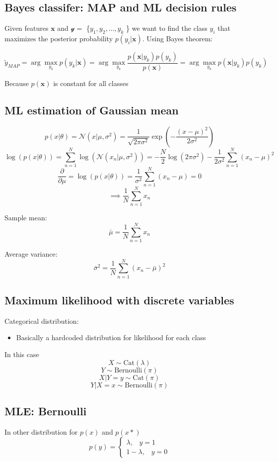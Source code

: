 \documentclass[12pt,a4paper]{article}
\begin{document}
\subsection{Bayes classifer: MAP and ML decision rules}
Given features $\mathbf{x}$ and $\mathscr{y} = $ \{$y_1, y_2, \ldots, y_k$ \} we want to find the class $y_i$ that maximizes the posterior probability $p(y_i|\mathbf{x})$. Using Bayes theorem:

\[
\tilde{y}_{MAP} = \arg\max_{y_k} p(y_k|\mathbf{x}) = \arg\max_{y_k} \frac{p(\mathbf{x}|y_k)p(y_k)}{p(\mathbf{x})} = \arg\max_{y_k} p(\mathbf{x}|y_k)p(y_k)
\]

Because $p(\mathbf{x})$ is constant for all classes

\subsection{ML estimation of Gaussian mean}
\[
p(x|\theta) = \mathcal{N}(x|\mu, \sigma^2) = \frac{1}{\sqrt{2\pi\sigma^2}} \exp\left( -\frac{(x - \mu)^2}{2\sigma^2} \right)
\]
\[
\log(p(x|\theta)) = \sum_{n=1}^{N} \log(\mathcal{N}(x_n|\mu, \sigma^2)) = -\frac{N}{2} \log(2\pi\sigma^2) - \frac{1}{2\sigma^2} \sum_{n=1}^{N} (x_n - \mu)^2
\]
\[
\frac{\partial}{\partial \mu} = \log(p(x|\theta)) = \frac{1}{\sigma^2} \sum_{n=1}^{N} (x_n - \mu) = 0
\]
\[
\implies \frac{1}{N} \sum_{n=1}^{N} x_n
\]

Sample mean:
\[
\bar{\mu} = \frac{1}{N} \sum_{n=1}^{N} x_n
\]

Average variance:
\[
\bar{\sigma}^2 = \frac{1}{N} \sum_{n=1}^{N} (x_n - \bar{\mu})^2
\]

\subsection{Maximum likelihood with discrete variables}
Categorical distribution:
\begin{itemize}
    \item Basically a hardcoded distribution for likelihood for each class
\end{itemize}
In this case
\[
X \sim \text{Cat}(\lambda)
\]
\[
Y \sim \text{Bernoulli}(\pi)
\]
\[
X | Y = y \sim \text{Cat}(\pi)
\]
\[
Y | X = x \sim \text{Bernoulli}(\pi)
\]

\subsection{MLE: Bernoulli}
In other distribution for $p(x)$ and $p(x*)$
\[
p(y) = \begin{cases}
    \lambda, \hspace{10pt} y = 1 \\
    1 - \lambda, \hspace{10pt} y = 0
\end{cases}
\]
\end{document}
